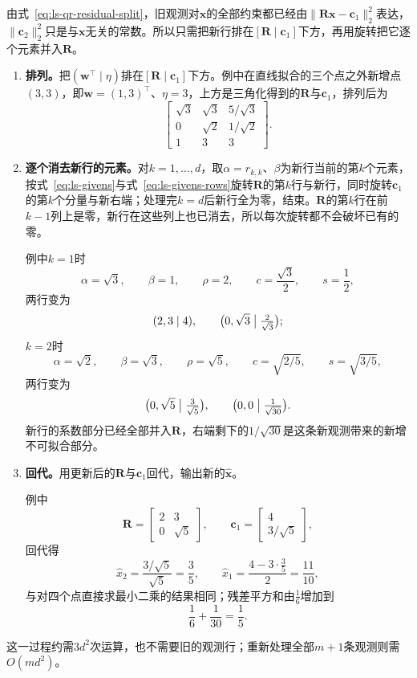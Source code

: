 由式~\eqref{eq:ls-qr-residual-split}，旧观测对$\bm x$的全部约束都已经由$\lVert\bm R\bm x-\bm c_1\rVert_2^2$表达，$\lVert\bm c_2\rVert_2^2$只是与$\bm x$无关的常数。所以只需把新行排在$[\bm R\mid\bm c_1]$下方，再用旋转把它逐个元素并入$\bm R$。
\begin{enumerate}
 \item \textbf{排列。}把$(\bm w^\top\mid\eta)$排在$[\bm R\mid\bm c_1]$下方。例中在直线拟合的三个点之外新增点$(3,3)$，即$\bm w=(1,3)^\top$、$\eta=3$，上方是三角化得到的$\bm R$与$\bm c_1$，排列后为
 \[
  \left[\begin{array}{cc|c}\sqrt3&\sqrt3&5/\sqrt3\\0&\sqrt2&1/\sqrt2\\\hline1&3&3\end{array}\right].
 \]

 \item \textbf{逐个消去新行的元素。}对$k=1,\ldots,d$，取$\alpha=r_{k,k}$、$\beta$为新行当前的第$k$个元素，按式~\eqref{eq:ls-givens}与式~\eqref{eq:ls-givens-rows}旋转$\bm R$的第$k$行与新行，同时旋转$\bm c_1$的第$k$个分量与新右端；处理完$k=d$后新行全为零，结束。$\bm R$的第$k$行在前$k-1$列上是零，新行在这些列上也已消去，所以每次旋转都不会破坏已有的零。

 例中$k=1$时
 \[
  \alpha=\sqrt3,\qquad \beta=1,\qquad \rho=2,\qquad c=\frac{\sqrt3}2,\qquad s=\frac12,
 \]
 两行变为
 \[
  (2,3\mid4),\qquad \bigl(0,\sqrt3\bigm|\tfrac2{\sqrt3}\bigr);
 \]
 $k=2$时
 \[
  \alpha=\sqrt2,\qquad \beta=\sqrt3,\qquad \rho=\sqrt5,\qquad c=\sqrt{2/5},\qquad s=\sqrt{3/5},
 \]
 两行变为
 \[
  \bigl(0,\sqrt5\bigm|\tfrac3{\sqrt5}\bigr),\qquad \bigl(0,0\bigm|\tfrac1{\sqrt{30}}\bigr).
 \]
 新行的系数部分已经全部并入$\bm R$，右端剩下的$1/\sqrt{30}$是这条新观测带来的新增不可拟合部分。

 \item \textbf{回代。}用更新后的$\bm R$与$\bm c_1$回代，输出新的$\hat{\bm x}$。

 例中
 \[
  \bm R=\begin{bmatrix}2&3\\0&\sqrt5\end{bmatrix},\qquad
  \bm c_1=\begin{bmatrix}4\\3/\sqrt5\end{bmatrix},
 \]
 回代得
 \[
  \hat x_2=\frac{3/\sqrt5}{\sqrt5}=\frac35,\qquad
  \hat x_1=\frac{4-3\cdot\frac35}{2}=\frac{11}{10},
 \]
 与对四个点直接求最小二乘的结果相同；残差平方和由$\tfrac16$增加到
 \[
  \frac16+\frac1{30}=\frac15 .
 \]
\end{enumerate}
这一过程约需$3d^2$次运算，也不需要旧的观测行；重新处理全部$m+1$条观测则需$O(md^2)$。

